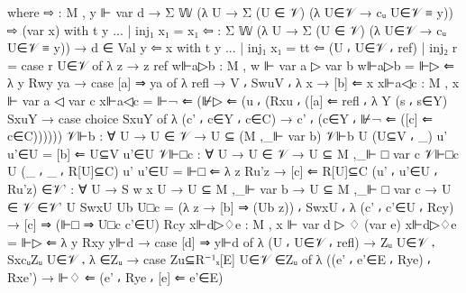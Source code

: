 \begin{spverbatim}
      where
      ⇨ : M , y ⊩ var d → Σ 𝕎 (λ U → Σ (U ∈ 𝒱) (λ U∈𝒱 → cᵤ U∈𝒱 ≡ y))
      ⇨ (var x) with t y
      ... | inj₁ x₁ = x₁
      ⇦ : Σ 𝕎 (λ U → Σ (U ∈ 𝒱) (λ U∈𝒱 → cᵤ U∈𝒱 ≡ y)) → d ∈ Val y
      ⇦ x with t y
      ... | inj₁ x₁ = tt
      ⇦ (U ⸴ U∈𝒱 ⸴ ref) | inj₂ r = case r U∈𝒱 of λ {z → z ref}
    w⊩a▷b : M , w ⊩ var a ▷ var b
    w⊩a▷b = ⊩▷ ⇐ λ { {y} Rwy ya → case [a] ⇒ ya of λ { refl → V ⸴ SwuV ⸴ λ {x → [b] ⇐ x}}}
    x⊩a◁c : M , x ⊩ var a ◁ var c
    x⊩a◁c = ⊩¬ ⇐ (⊮▷ ⇐ (u ⸴ (Rxu ⸴ ([a] ⇐ refl ⸴ λ {Y (s ⸴ s∈Y) SxuY →
      case choice SxuY of λ { (c' ⸴ c∈Y ⸴ c∈C) → c' ⸴ (c∈Y ⸴ ⊮¬ ⇐ ([c] ⇐ c∈C))}}))))
    𝒱⊩b : ∀ {U} → U ∈ 𝒱 → U ⊆ (M ,_⊩ var b)
    𝒱⊩b {U} (U⊆V ⸴ _) {u'} u'∈U = [b] ⇐ U⊆V u'∈U
    𝒱⊩□c : ∀ {U} → U ∈ 𝒱 → U ⊆ M ,_⊩ □ var c
    𝒱⊩□c {U} (_ ⸴ _ ⸴ R[U]⊆C) {u'} u'∈U = ⊩□ ⇐ λ { {z} Ru'z → [c] ⇐ R[U]⊆C (u' ⸴ u'∈U ⸴ Ru'z)}
    ∈𝒱' : ∀ {U} → S w x U → U ⊆ M ,_⊩ var b → U ⊆ M ,_⊩ □ var c → U ∈ 𝒱
    ∈𝒱' {U} SwxU Ub U□c = (λ z → [b] ⇒ (Ub z)) ⸴ SwxU ⸴ λ { (c' ⸴ c'∈U ⸴ Rcy)
      → [c] ⇒ (⊩□ ⇒ U□c c'∈U) Rcy}
    x⊩d▷♢e : M , x ⊩ var d ▷ ♢ (var e)
    x⊩d▷♢e = ⊩▷ ⇐ λ { {y} Rxy y⊩d → case [d] ⇒ y⊩d of
      λ { (U ⸴ U∈𝒱 ⸴ refl) → Zᵤ U∈𝒱 ⸴ SxcᵤZᵤ U∈𝒱 ⸴
       λ { ∈Zᵤ → case Zu⊆R⁻¹ₓ[E] U∈𝒱 ∈Zᵤ of λ { ((e' ⸴ e'∈E ⸴ Rye) ⸴ Rxe') → ⊩♢ ⇐ (e' ⸴ Rye ⸴ [e] ⇐ e'∈E)}} }}

\end{spverbatim}

